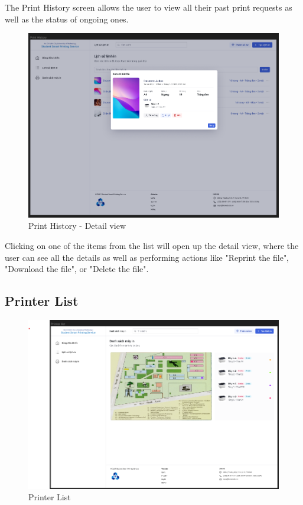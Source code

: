 The Print History screen allows the user to view all their past print requests as well as the status of ongoing ones.

\begin{figure}[H]
  \includegraphics[max width=0.9\linewidth]{chapters/5. mvp-wireframe/6. Print History - Details.png}
  \caption{Print History - Detail view}%
\end{figure}

Clicking on one of the items from the list will open up the detail view, where the user can see all the details as well as performing actions like "Reprint the file", "Download the file", or "Delete the file".

\subsection{Printer List}

\begin{figure}[H]
  \includegraphics[max width=0.9\linewidth]{chapters/5. mvp-wireframe/7. Printer List.png}
  \caption{Printer List}%
\end{figure}

